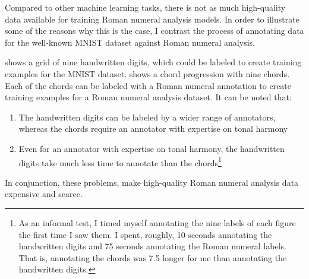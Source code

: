 

Compared to other machine learning tasks, there is not as
much high-quality data available for training Roman numeral
analysis models. In order to illustrate some of the reasons
why this is the case, I contrast the process of annotating
data for the well-known MNIST dataset
\parencite{lecun1989handwritten} against Roman numeral analysis.


 shows a grid of nine handwritten digits,
which could be labeled to create training examples for the MNIST dataset.
 shows a chord progression with nine chords.
Each of the chords can be labeled with a Roman numeral
annotation to create training examples for a Roman numeral analysis dataset. It can be noted
that:

\begin{enumerate}
    \item The handwritten digits can be labeled by a wider
    range of annotators, whereas the chords require an annotator with expertise on tonal harmony
    \item Even for an annotator with expertise on tonal harmony, the handwritten digits take much less time to annotate than the chords\footnote{As an informal test, I timed myself annotating the nine labels of each figure the first time I saw them. I spent, roughly, 10 seconds annotating the handwritten digits and 75 seconds annotating the Roman numeral labels. That is, annotating the chords was 7.5 longer for me than annotating the handwritten digits.}
\end{enumerate}

In conjunction, these problems, make high-quality Roman numeral analysis data expensive and scarce.


